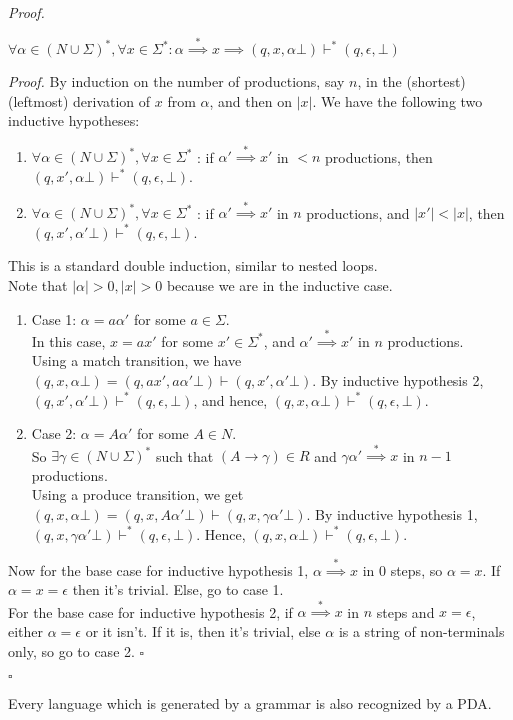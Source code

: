 \documentclass[a4paper]{article}
\newenvironment{proof}{\begin{breakbox}\textit{Proof.}}{\hfill$\square$\end{breakbox}}
\newcommand{\nl}{\vspace{0.2cm}\\}
\newcommand{\derives}{\stackrel{*}{\implies}}
\newcommand{\changesto}{\vdash}
\begin{document}
\begin{proof}
\begin{claim}
        $\forall \alpha \in (N \cup \Sigma)^*, \forall x \in \Sigma^* : \alpha \derives x \implies (q, x, \alpha\bot) \changesto^* (q, \epsilon, \bot)$
    \end{claim}
    \begin{proof}
        By induction on the number of productions, say $n$, in the (shortest) (leftmost) derivation of $x$ from $\alpha$, and then on $|x|$. We have the following two inductive hypotheses:
        \begin{enumerate}
            \item $\forall \alpha \in (N \cup \Sigma)^*, \forall x \in \Sigma^*$ : if $\alpha' \derives x'$ in $< n$ productions, then $(q, x', \alpha\bot) \changesto^* (q, \epsilon, \bot)$.
            \item $\forall \alpha \in (N \cup \Sigma)^*, \forall x \in \Sigma^*$ : if $\alpha' \derives x'$ in $n$ productions, and $|x'| < |x|$, then $(q, x', \alpha'\bot) \changesto^* (q,
                \epsilon, \bot)$.
        \end{enumerate}
        This is a standard double induction, similar to nested loops.\nl
        Note that $|\alpha| > 0, |x| > 0$ because we are in the inductive case.
        \begin{enumerate}
            \item Case 1: $\alpha = a \alpha'$ for some $a \in \Sigma$.\nl
                In this case, $x = a x'$ for some $x' \in \Sigma^*$, and $\alpha' \derives x'$ in $n$ productions.\nl
                Using a match transition, we have $(q, x, \alpha \bot) = (q, ax', a\alpha'\bot) \changesto (q, x', \alpha'\bot)$. By inductive hypothesis 2, $(q, x', \alpha'\bot) \changesto^* (q,
                \epsilon, \bot)$, and hence, $(q, x, \alpha\bot) \changesto^* (q, \epsilon, \bot)$.
            \item Case 2: $\alpha = A\alpha'$ for some $A \in N$.\nl
                So $\exists \gamma \in (N \cup \Sigma)^*$ such that $(A \to \gamma) \in R$ and $\gamma \alpha' \derives x$ in $n - 1$ productions.\nl
                Using a produce transition, we get $(q, x, \alpha\bot) = (q, x, A\alpha'\bot) \changesto (q, x, \gamma\alpha'\bot)$. By inductive hypothesis 1, $(q, x, \gamma\alpha'\bot)
                \changesto^* (q, \epsilon, \bot)$. Hence, $(q, x, \alpha\bot) \changesto^* (q, \epsilon, \bot)$.
        \end{enumerate}
        Now for the base case for inductive hypothesis 1, $\alpha \derives x$ in $0$ steps, so $\alpha = x$. If $\alpha = x = \epsilon$ then it's trivial. Else, go to case 1.\nl
        For the base case for inductive hypothesis 2, if $\alpha \derives x$ in $n$ steps and $x = \epsilon$, either $\alpha = \epsilon$ or it isn't. If it is, then it's trivial, else $\alpha$ is a string of non-terminals
        only, so go to case 2.
    \end{proof}

\end{proof}

\begin{cor}
    Every language which is generated by a grammar is also recognized by a PDA.
\end{cor}
\end{document}
